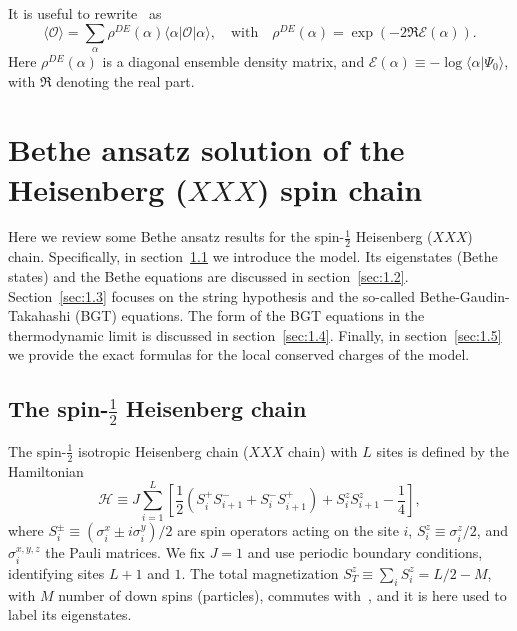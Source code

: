 \documentclass[11pt]{iopart}
\begin{document}
It is useful to rewrite~ as 
%
\begin{equation}
\label{qa-prob}
\langle{\mathcal O}\rangle=\sum\limits_{\alpha}\rho^{DE}(\alpha)
\langle\alpha|{\mathcal O}|\alpha\rangle,\quad\textrm{with}\quad 
\rho^{DE}(\alpha)=\exp(-2\Re{\mathcal E}(\alpha)).
\end{equation}
%
Here $\rho^{DE}(\alpha)$ is a diagonal ensemble density matrix, and ${\mathcal E}(\alpha)
\equiv-\log\langle\alpha|\Psi_0\rangle$, with $\Re$ denoting the real part. 

\section{Bethe ansatz solution of the Heisenberg ($XXX$) spin chain}
\label{sec:1}

Here we review some Bethe ansatz results for the spin-$\frac{1}{2}$ Heisenberg 
($XXX$) chain. Specifically, in section~\ref{sec:1.1} we introduce the model. 
Its eigenstates (Bethe states) and the Bethe equations are discussed in 
section~\ref{sec:1.2}. Section~\ref{sec:1.3} focuses on the string hypothesis 
and the so-called Bethe-Gaudin-Takahashi (BGT) equations. The form of the 
BGT equations in the thermodynamic limit is discussed in section~\ref{sec:1.4}. 
Finally, in section~\ref{sec:1.5} we provide the exact formulas for the 
local conserved charges of the model. 


\subsection{The spin-$\frac{1}{2}$ Heisenberg chain}
\label{sec:1.1}

The spin-$\frac{1}{2}$ isotropic Heisenberg chain ($XXX$ chain) with $L$ sites 
is defined by the Hamiltonian 
%
\begin{equation}
\label{xxx-ham}
{\mathcal H}\equiv J\sum\limits_{i=1}^L\left[\frac{1}{2}(S_i^+S^-_{i+1} 
+S_i^{-}S_{i+1}^+)+S_i^zS_{i+1}^z-\frac{1}{4}\right],  
\end{equation}
%
where $S^{\pm}_i\equiv (\sigma_i^x\pm i\sigma_i^y)/2$ are spin operators acting on the 
site $i$, $S_i^z\equiv\sigma_i^z/2$, and $\sigma^{x,y,z}_i$ the Pauli matrices. We fix 
$J=1$ and use periodic boundary conditions, identifying sites $L+1$ and $1$. The total 
magnetization $S_{T}^z\equiv\sum_iS_i^z=L/2-M$, with $M$ number of down spins (particles), 
commutes with~, and it is here used to label its eigenstates. 
\end{document}
